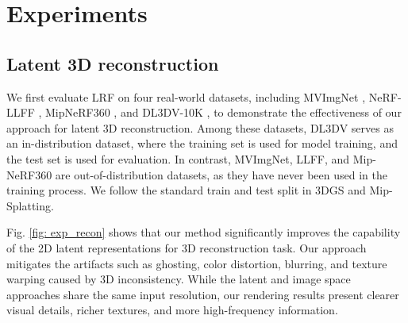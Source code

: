 





\section{Experiments}
\label{sec: exp}




\subsection{Latent 3D reconstruction}
We first evaluate LRF on four real-world datasets, including MVImgNet \citep{yu2023mvimgnet}, NeRF-LLFF \citep{mildenhall2019llff}, MipNeRF360 \citep{barron2022mipnerf360}, and DL3DV-10K \cite{ling2024dl3dv}, to demonstrate the effectiveness of our approach for latent 3D reconstruction. Among these datasets, DL3DV serves as an in-distribution dataset, where the training set is used for model training, and the test set is used for evaluation. In contrast, MVImgNet, LLFF, and Mip-NeRF360 are out-of-distribution datasets, as they have never been used in the training process. We follow the standard train and test split in 3DGS and Mip-Splatting\citep{kerbl3Dgaussians,Yu2024MipSplatting}. 


Fig. \ref{fig: exp_recon} shows that our method significantly improves the capability of the 2D latent representations for 3D reconstruction task. Our approach mitigates the artifacts such as ghosting, color distortion, blurring, and texture warping caused by 3D inconsistency. While the latent and image space approaches share the same input resolution, our rendering results present clearer visual details, richer textures, and more high-frequency information.


